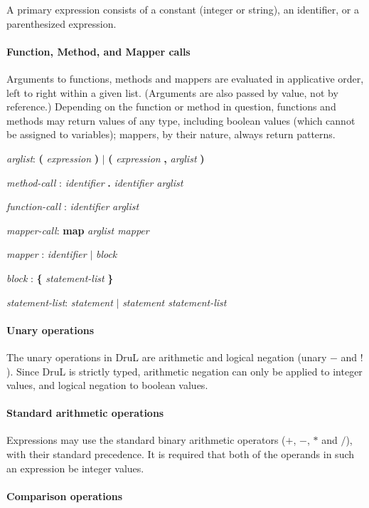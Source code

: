 A primary expression consists of a constant (integer or string), an identifier, or a parenthesized expression.

\paragraph{Function, Method, and Mapper calls}

Arguments to functions, methods and mappers are evaluated in applicative order, left to right within a given list.  (Arguments are also passed by value, not by reference.)  Depending on the function or method in question, functions and methods may return values of any type, including boolean values (which cannot be assigned to variables); mappers, by their nature, always return patterns.

\emph{arglist}: \textbf ( \emph{expression} \textbf ) $|$  \textbf ( \emph{expression} 
\textbf{,} \emph{arglist} \textbf )

\emph{method-call} : \emph{identifier} \textbf . \emph{identifier arglist} 

\emph{function-call} : \emph{identifier} \emph{arglist}

\emph{mapper-call}:  \textbf{map} \emph{arglist mapper}

\emph{mapper} : \emph{identifier} $|$ \emph{block}

\emph{block} : \textbf{\{} \emph{statement-list} \textbf{\}} 

\emph{statement-list}: \emph{statement} $|$ \emph{statement statement-list}

\paragraph{Unary operations}

The unary operations in DruL are arithmetic and logical negation (unary $-$ and $!$).  Since DruL is strictly typed, arithmetic negation can only be applied to integer values, and logical negation to boolean values.

\paragraph{Standard arithmetic operations}

Expressions may use the standard binary arithmetic operators ($+$, $-$, $*$ and $/$), with their standard precedence.  It is required that both of the operands in such an expression be integer values.

\paragraph{Comparison operations}

